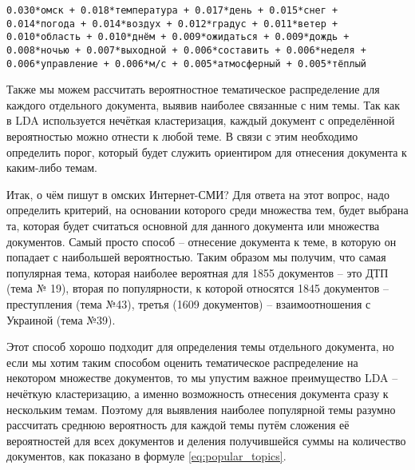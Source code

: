 \texttt{0.030*омск + 0.018*температура + 0.017*день + 0.015*снег + 0.014*погода + 0.014*воздух + 0.012*градус + 0.011*ветер + 0.010*область + 0.010*днём + 0.009*ожидаться + 0.009*дождь + 0.008*ночью + 0.007*выходной + 0.006*составить + 0.006*неделя + 0.006*управление + 0.006*м/с + 0.005*атмосферный + 0.005*тёплый}

Также мы можем рассчитать вероятностное тематическое распределение для каждого отдельного документа, выявив наиболее связанные с ним темы. Так как в LDA используется нечёткая кластеризация, каждый документ с определённой вероятностью можно отнести к любой теме. В связи с этим необходимо определить порог, который будет служить ориентиром для отнесения документа к каким-либо темам.



Итак, о чём пишут в омских Интернет-СМИ? Для ответа на этот вопрос, надо определить критерий, на основании которого среди множества тем, будет выбрана та, которая будет считаться основной для данного документа или множества документов. Самый просто способ -- отнесение документа к теме, в которую он попадает с наибольшей вероятностью. Таким образом мы получим, что самая популярная тема, которая наиболее вероятная для 1855 документов -- это ДТП (тема № 19), вторая по популярности, к которой относятся 1845 документов -- преступления (тема №43), третья (1609 документов) -- взаимоотношения с Украиной (тема №39). 

Этот способ хорошо подходит для определения темы отдельного документа, но если мы хотим таким способом оценить тематическое распределение на некотором множестве документов, то мы упустим важное преимущество LDA -- нечёткую кластеризацию, а именно возможность отнесения документа сразу к нескольким темам. Поэтому для выявления наиболее популярной темы разумно рассчитать среднюю вероятность для каждой темы путём сложения её вероятностей для всех документов и деления получившейся суммы на количество документов, как показано в формуле \ref{eq:popular_topics}.

